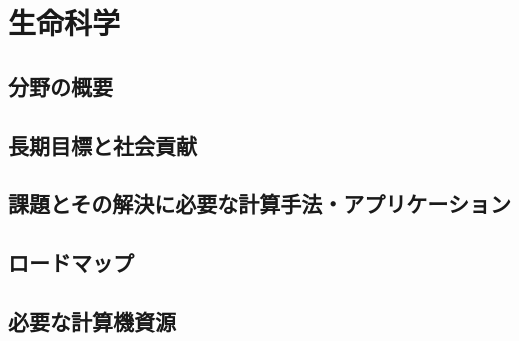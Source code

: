 \section{生命科学}
\label{sec:生命科学}

\subsection{分野の概要}

\subsection{長期目標と社会貢献}

\subsection{課題とその解決に必要な計算手法・アプリケーション}

\subsection{ロードマップ}

\subsection{必要な計算機資源}


\nocite{*}


